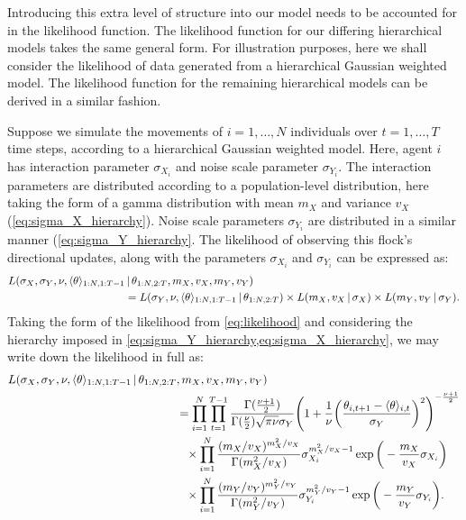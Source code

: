 Introducing this extra level of structure into our model needs to be accounted for in the
likelihood function. The likelihood function for our differing hierarchical models takes
the same general form. For illustration purposes, here we shall consider the likelihood of
data generated from a hierarchical Gaussian weighted model. The likelihood function for
the remaining hierarchical models can be derived in a similar fashion.

Suppose we simulate the movements of $i=1,\ldots,N$ individuals over $t=1,\ldots,T$ time
steps, according to a hierarchical Gaussian weighted model. Here, agent $i$ has
interaction parameter $\sigma_{X_i}$ and noise scale parameter $\sigma_{Y_i}$. The
interaction parameters are distributed according to a population-level distribution, here
taking the form of a gamma distribution with mean $m_X$ and variance $v_X$
(\cref{eq:sigma_X_hierarchy}). Noise scale parameters $\sigma_{Y_i}$ are distributed in a
similar manner (\cref{eq:sigma_Y_hierarchy}. The likelihood of observing this flock's
directional updates, along with the parameters $\sigma_{X_i}$ and $\sigma_{Y_i}$ can be
expressed as:
\begin{align}
  \label{eq:hierarchical_likelihood}
  \begin{split}
      L(\sigma_X, \sigma_Y, \nu, \langle\theta\rangle_{1:N,1:T-1} &\,|\, \theta_{1:N,2:T},
    m_X, v_X, m_Y, v_Y) \\
    &= L(\sigma_Y, \nu, \langle\theta\rangle_{1:N,1:T-1} \,|\, \theta_{1:N,2:T}) \times
    L(m_X, v_X \,|\, \sigma_X)
    \times
    L(m_Y, v_Y \,|\, \sigma_Y).
  \end{split}
\end{align}
Taking the form of the likelihood from \cref{eq:likelihood} and considering the hierarchy
imposed in \cref{eq:sigma_Y_hierarchy,eq:sigma_X_hierarchy}, we may write down the
likelihood in full as:
\begin{align}
  \begin{split}
      L(\sigma_X, \sigma_Y, \nu, \langle\theta\rangle_{1:N,1:T-1} \,|\, \theta_{1:N,2:T}&,
    m_X, v_X, m_Y, v_Y) \\
    &= \prod_{i=1}^N \prod_{t=1}^{T-1}
    \frac{\Gamma(\frac{\nu +1 }{2})}{\Gamma(\frac{\nu}{2})\sqrt{\pi\nu}\sigma_Y}
    \Bigg(1 + \frac{1}{\nu}
    \bigg(\frac{\theta_{i,t+1}-\langle\theta\rangle_{i,t}}{\sigma_Y}\bigg)^2
    \Bigg)^{-\frac{\nu+1}{2}}\\
    &\hphantom{=}\times\prod_{i=1}^N \frac{(m_X / v_X)^{m_X^2 / v_X}}{\Gamma(m_X^2/v_X)}
        \sigma_{X_i}^{m_X^2/v_X - 1} \exp\bigg(-\frac{m_X}{v_X}\sigma_{X_i}\bigg)\\
    &\hphantom{=}\times\prod_{i=1}^N \frac{(m_Y / v_Y)^{m_Y^2 / v_Y}}{\Gamma(m_Y^2/v_Y)}
        \sigma_{Y_i}^{m_Y^2/v_Y - 1} \exp\bigg(-\frac{m_Y}{v_Y}\sigma_{Y_i}\bigg).\\
  \end{split}
\end{align}

